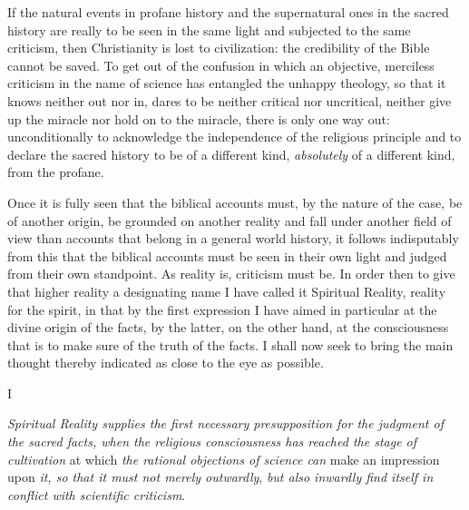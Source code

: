 \documentclass[12pt,a4paper,openany]{book}
\newcommand{\opage}[1]{\marginnote{\footnotesize\textit{[#1]}}}
\begin{document}
If the natural events in profane history
and the supernatural ones in the sacred history are really
to be seen in the same light and subjected to the same criticism, then
Christianity is lost to civilization: the credibility of the Bible
cannot be saved. To get out of
the confusion in which an objective, merciless criticism in the name of science
has entangled the unhappy theology, so that
it knows neither out nor in, dares to be neither critical
nor uncritical, neither give up the miracle nor hold on to
the miracle, there is only one way out: unconditionally to acknowledge
the independence of the religious principle and to declare
the sacred history to be of a different kind, \emph{absolutely} of a different kind, from
the profane.

Once it is fully seen that the biblical accounts
must, by the nature of the case, be of another origin,
be grounded on another reality and fall
under another field of view than accounts that belong
in a general world history, it follows
indisputably from this that the biblical accounts must be seen
in their own light and judged from their own standpoint.
As reality is, criticism must be. In order then to
\setcounter{footnote}{0}%
\opage{3}give that higher reality a designating name I have
called it Spiritual Reality, reality for the spirit, in that
by the first expression I have aimed in particular at the divine origin of the
facts, by the latter, on the other hand,
at the consciousness that is to make sure of the
truth of the facts. I shall now seek to bring
the main thought thereby indicated as close to the eye as
possible.

\begin{center}I\end{center}

\emph{Spiritual Reality supplies the first necessary
presupposition for the judgment of the
sacred facts, when the religious
consciousness has reached the stage of cultivation} at which
\emph{the rational objections of science can}
make an impression upon \emph{it, so that it must not merely outwardly},
\emph{but also inwardly find itself in conflict with scientific criticism}.
\end{document}
